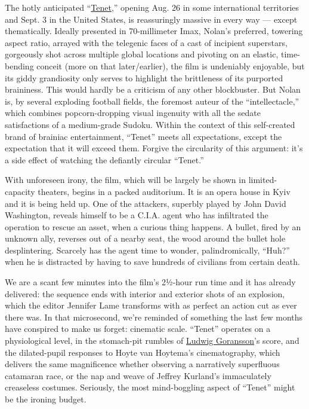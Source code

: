 The hotly anticipated ``\href{https://www.tenetfilm.com/}{Tenet},''
opening Aug. 26 in some international territories and Sept. 3 in the
United States, is reassuringly massive in every way --- except
thematically. Ideally presented in 70-millimeter Imax, Nolan's
preferred, towering aspect ratio, arrayed with the telegenic faces of a
cast of incipient superstars, gorgeously shot across multiple global
locations and pivoting on an elastic, time-bending conceit (more on that
later/earlier), the film is undeniably enjoyable, but its giddy
grandiosity only serves to highlight the brittleness of its purported
braininess. This would hardly be a criticism of any other blockbuster.
But Nolan is, by several exploding football fields, the foremost auteur
of the ``intellectacle,'' which combines popcorn-dropping visual
ingenuity with all the sedate satisfactions of a medium-grade Sudoku.
Within the context of this self-created brand of brainiac entertainment,
``Tenet'' meets all expectations, except the expectation that it will
exceed them. Forgive the circularity of this argument: it's a side
effect of watching the defiantly circular ``Tenet.''

With unforeseen irony, the film, which will be largely be shown in
limited-capacity theaters, begins in a packed auditorium. It is an opera
house in Kyiv and it is being held up. One of the attackers, superbly
played by John David Washington, reveals himself to be a C.I.A. agent
who has infiltrated the operation to rescue an asset, when a curious
thing happens. A bullet, fired by an unknown ally, reverses out of a
nearby seat, the wood around the bullet hole desplintering. Scarcely has
the agent time to wonder, palindromically, ``Huh?'' when he is
distracted by having to save hundreds of civilians from certain death.

We are a scant few minutes into the film's 2½-hour run time and it has
already delivered: the sequence ends with interior and exterior shots of
an explosion, which the editor Jennifer Lame transforms with as perfect
an action cut as ever there was. In that microsecond, we're reminded of
something the last few months have conspired to make us forget:
cinematic scale. ``Tenet'' operates on a physiological level, in the
stomach-pit rumbles of
\href{https://www.nytimes3xbfgragh.onion/2019/11/11/arts/music/ludwig-goransson-mandalorian.html}{Ludwig
Goransson}'s score, and the dilated-pupil responses to Hoyte van
Hoytema's cinematography, which delivers the same magnificence whether
observing a narratively superfluous catamaran race, or the nap and weave
of Jeffrey Kurland's immaculately creaseless costumes. Seriously, the
most mind-boggling aspect of ``Tenet'' might be the ironing budget.


